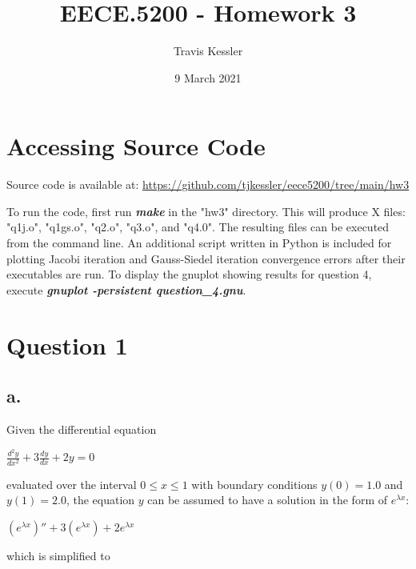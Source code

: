\documentclass{report}
\title{EECE.5200 - Homework 3}
\author{Travis Kessler}
\date{9 March 2021}
\begin{document}
	\maketitle
	\newpage

	\lstset{frame=lines}

	\section*{Accessing Source Code}
	
	Source code is available at: \href{https://github.com/tjkessler/eece5200/tree/main/hw3}{https://github.com/tjkessler/eece5200/tree/main/hw3}
	
	\textit{}
	
	\noindent To run the code, first run \textbf{\textit{make}} in the "hw3" directory. This will produce X files: "q1j.o", "q1gs.o", "q2.o", "q3.o", and "q4.0". The resulting files can be executed from the command line. An additional script written in Python is included for plotting Jacobi iteration and Gauss-Siedel iteration convergence errors after their executables are run. To display the gnuplot showing results for question 4, execute \textbf{\textit{gnuplot -persistent question\_4.gnu}}.
	
	\section*{Question 1}
	
	\subsection*{a.}
	
	Given the differential equation
	
	\textit{}
	
	$\frac{d^2y}{dx^2} + 3 \frac{dy}{dx} + 2y = 0$

	\textit{}
	
	\noindent evaluated over the interval $0 \leq x \leq 1$ with boundary conditions $y(0) = 1.0$ and $y(1) = 2.0$, the equation $y$ can be assumed to have a solution in the form of $e^{\lambda x}$:
	
	\textit{}
	
	$\left( e^{\lambda x} \right) '' + 3 \left( e^{\lambda x} \right) + 2e^{\lambda x}$
	
	\textit{}
	
	\noindent which is simplified to
	
	\textit{}
	
\end{document}

